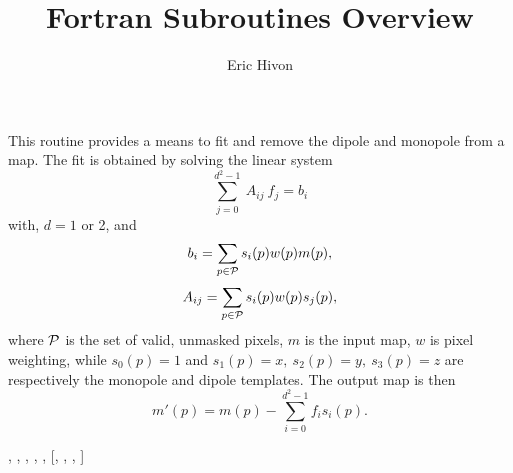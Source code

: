 
\sloppy


\title{\healpix Fortran Subroutines Overview}
 \section[remove\_dipole*]{ }
\label{sub:remove_dipole}
\author{Eric Hivon}
\newcommand{\vecf}{{\rm{ \bf f}}}
\newcommand{\vecb}{{\rm{ \bf b}}}
\newcommand{\matA}{{\rm{ \bf A}}}
\newcommand{\calP}{\cal{P}}

\begin{facility}
{This routine provides a means to fit and remove the dipole and monopole
from a \healpix map. The fit is obtained by solving the linear system
\begin{equation}
	\sum_{j=0}^{d^2-1}\ A_{ij}\ f_j = b_i
\end{equation}
 with, $d=1$ or 2, and
\begin{equation}
	b_i = \sum_{p \in \calP} s_i(p) w(p) m(p),
\end{equation}
\begin{equation}
	A_{ij} = \sum_{p \in \calP} s_i(p) w(p) s_j(p),
\end{equation}
 where $\calP$ is the set of
valid, unmasked pixels, $m$ is the input map, $w$ is pixel weighting, while
$s_0(p) = 1$ and $s_1(p)=x,\ s_2(p)=y,\ s_3(p)=z$ are
respectively the monopole and dipole templates. The output map is then
\begin{equation}
	m'(p) = m(p) - \sum_{i=0}^{d^2-1} f_i s_i(p).
\end{equation}
}
{\modPixTools}
\end{facility}

\begin{f90format}
{%
, %
, %
, %
, %
, %
 [, %
, %
, %
]}
\end{f90format}


